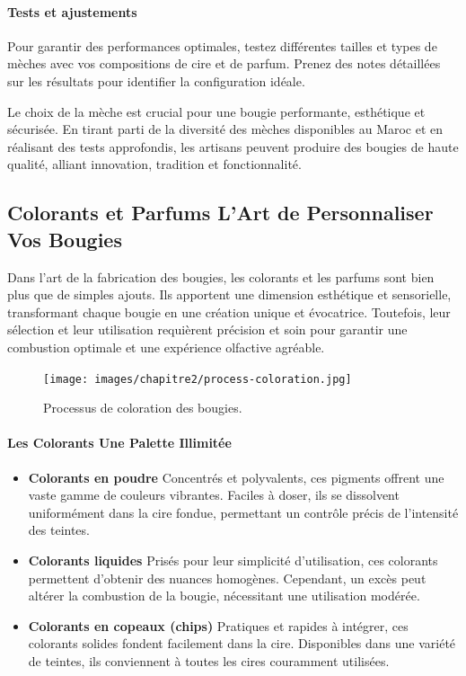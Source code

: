 \documentclass[11pt,fleqn,onecolumn,oneside]{book}
\begin{document}
\paragraph{Tests et ajustements}

Pour garantir des performances optimales, testez différentes tailles et types de mèches avec vos compositions de cire et de parfum. Prenez des notes détaillées sur les résultats pour identifier la configuration idéale.


\begin{corollary}
Le choix de la mèche est crucial pour une bougie performante, esthétique et sécurisée. En tirant parti de la diversité des mèches disponibles au Maroc et en réalisant des tests approfondis, les artisans peuvent produire des bougies de haute qualité, alliant innovation, tradition et fonctionnalité.
\end{corollary}

\subsection*{Colorants et Parfums L’Art de Personnaliser Vos Bougies}

\begin{definition}
Dans l’art de la fabrication des bougies, les colorants et les parfums sont bien plus que de simples ajouts. Ils apportent une dimension esthétique et sensorielle, transformant chaque bougie en une création unique et évocatrice. Toutefois, leur sélection et leur utilisation requièrent précision et soin pour garantir une combustion optimale et une expérience olfactive agréable.
\end{definition}

\begin{figure}[htbp]
    \centering
    \texttt{[image: images/chapitre2/process-coloration.jpg]}
    \caption{Processus de coloration des bougies.}
    \label{fig:process_coloration}
\end{figure}


\paragraph{Les Colorants Une Palette Illimitée}

\begin{itemize}
    \item \textbf{Colorants en poudre} Concentrés et polyvalents, ces pigments offrent une vaste gamme de couleurs vibrantes. Faciles à doser, ils se dissolvent uniformément dans la cire fondue, permettant un contrôle précis de l’intensité des teintes.
    \item \textbf{Colorants liquides} Prisés pour leur simplicité d’utilisation, ces colorants permettent d’obtenir des nuances homogènes. Cependant, un excès peut altérer la combustion de la bougie, nécessitant une utilisation modérée.
    \item \textbf{Colorants en copeaux (chips)} Pratiques et rapides à intégrer, ces colorants solides fondent facilement dans la cire. Disponibles dans une variété de teintes, ils conviennent à toutes les cires couramment utilisées.
\end{itemize}
\end{document}
